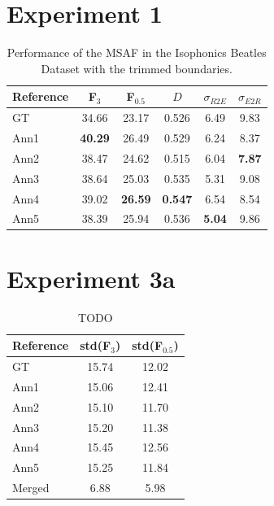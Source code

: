 \documentclass{article}
\begin{document}
\section{Experiment 1}

\begin{table}
 \begin{center}
   \begin{tabular}{|l|c|c|c|c|c|}
  \hline
  Reference & F$_3$ & F$_{0.5}$ & $D$ & $\sigma_{R2E}$ & $\sigma_{E2R}$\\
  \hline
  GT          & 34.66 & 23.17 & 0.526 & 6.49 & 9.83 \\
  Ann1        & \textbf{40.29} & 26.49 & 0.529 & 6.24 & 8.37 \\
  Ann2        & 38.47 & 24.62 & 0.515 & 6.04 & \textbf{7.87} \\
  Ann3        & 38.64 & 25.03 & 0.535 & 5.31 & 9.08 \\
  Ann4        & 39.02 & \textbf{26.59} & \textbf{0.547} & 6.54 & 8.54 \\
  Ann5        & 38.39 & 25.94 & 0.536 & \textbf{5.04} & 9.86 \\
  \hline
 \end{tabular}
\end{center}
 \caption{Performance of the MSAF in the Isophonics Beatles Dataset with the trimmed boundaries.}
 \label{tab:experiment1}
\end{table}

\section{Experiment 3a}

\begin{table}
 \begin{center}
   \begin{tabular}{|l|c|c|}
  \hline
  Reference & std(F$_3$) & std(F$_{0.5}$) \\
  \hline
  GT          & 15.74 & 12.02 \\
  Ann1        & 15.06 & 12.41 \\
  Ann2        & 15.10 & 11.70 \\
  Ann3        & 15.20 & 11.38 \\
  Ann4        & 15.45 & 12.56 \\
  Ann5        & 15.25 & 11.84 \\
  \hline
  Merged      & 6.88 & 5.98 \\
  \hline
 \end{tabular}
\end{center}
 \caption{TODO}
 \label{tab:experiment3a}
\end{table}
\end{document}
